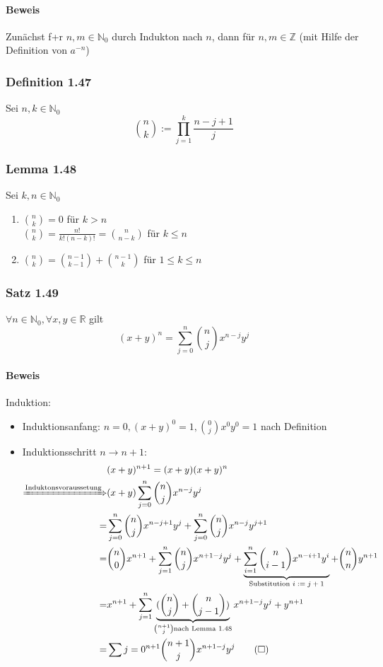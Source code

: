\documentclass[a4paper]{scrartcl}
\DeclareMathOperator{\Forall}{\forall}%
\begin{document}
\paragraph{Beweis}
\label{sec-2-9-13-1}
Zunächst f+r $n,m\in\mathbb{N}_0$ durch Indukton nach $n$, dann für $n,m\in\mathbb{Z}$ (mit Hilfe der Definition von $a^{-n}$)
\subsubsection{Definition 1.47}
\label{sec-2-9-14}
Sei $n,k\in\mathbb{N}_0$ \[\binom{n}{k}:=\prod_{j=1}^k \frac{n -j + 1}{j}\]
\subsubsection{Lemma 1.48}
\label{sec-2-9-15}
Sei $k,n\in\mathbb{N}_0$
\begin{enumerate}
\item $\binom{n}{k} = 0$ für $k > n$ \\
       $\binom{n}{k} = \frac{n!}{k!(n -k)!} = \binom{n}{n - k}$ für $k\leq n$
\item $\binom{n}{k} = \binom{n - 1}{k - 1} + \binom{n - 1}{k}$ für $1 \leq k \leq n$
\end{enumerate}
\subsubsection{Satz 1.49}
\label{sec-2-9-16}
$\Forall n\in\mathbb{N}_0,\Forall x,y\in\mathbb{R}$ gilt
\[(x + y)^n = \sum_{j = 0}^n \binom{n}{j}x^{n - j}y^j\]
\paragraph{Beweis}
\label{sec-2-9-16-1}
Induktion:
\begin{itemize}
\item Induktionsanfang: $n = 0,(x+y)^0 = 1,\binom{0}{j}x^0y^0 = 1$ nach Definition
\item Induktionsschritt $n \to n + 1:$
\begin{align}
&(x + y)^{n + 1} = (x +y)(x+y)^n \\
\xRightarrow{\text{Induktonsvoraussetung}} &(x + y)\sum_{j = 0}^n \binom{n}{j}x^{n - j} y^j \\
= &\sum_{j=0}^n \binom{n}{j}x^{n - j + 1}y^j + \sum_{j = 0}^n \binom{n}{j} x^{n - j} y^{j + 1} \\
= &\binom{n}{0}x^{n + 1} + \sum_{j = 1}^n \binom{n}{j}x^{n + 1 - j}y^j + \underbrace{\sum_{i = 1}^n \binom{n}{i - 1} x^{n - i + 1} y^i}_{\text{Substitution $i:= j + 1$}} + \binom{n}{n}y^{n + 1} \\
= &x^{n + 1} + \sum_{j = 1}^n \underbrace{(\binom{n}{j} + \binom{n}{j - 1})}_{\binom{n + 1}{j}\text{nach Lemma 1.48}} x^{n + 1 - j} y^j + y^{n + 1} \\
= &\sum{j = 0}^{n + 1} \binom{n + 1}{j}x^{n + 1 - j}y^j\tag{$\square$}
\end{align}
\end{itemize}
\end{document}

